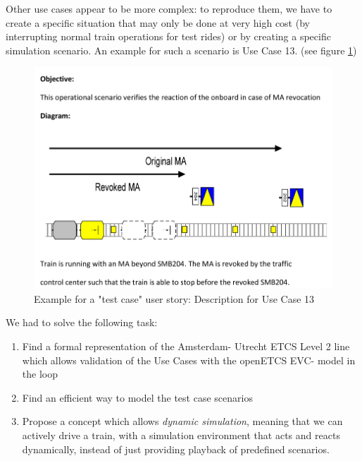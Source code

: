 \documentclass{template/openetcs_article}
\begin{document}
Other use cases appear to be more complex: to reproduce them, we have to create a specific situation that may only be done at very high cost (by interrupting normal train operations for test rides) or by creating a specific simulation scenario. An example for such a scenario is Use Case 13. (see figure \ref{fig:d-us13})

\begin{figure}
  \centering
  \includegraphics[width=5in]{images/DescrUserStory13}
  \caption{Example for a "test case" user story: Description for Use Case 13}
  \label{fig:d-us13}
\end{figure}


We had to solve the following task:

\begin{enumerate}
 \item Find a formal representation of the Amsterdam- Utrecht ETCS Level 2 line which allows validation of the Use Cases with the openETCS EVC- model in the loop
 \item Find an efficient way to model the test case scenarios
 \item Propose a concept which allows \emph{dynamic simulation}, meaning that we can actively drive a train, with a simulation environment that acts and reacts dynamically, instead of just providing playback of predefined scenarios.
\end {enumerate}
\end{document}
